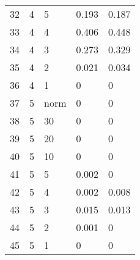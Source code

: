 \begin{table}[ht]
\begin{tabular}{rllll}
  32 & 4 & 5 & 0.193 & 0.187 \\ 
  33 & 4 & 4 & 0.406 & 0.448 \\ 
  34 & 4 & 3 & 0.273 & 0.329 \\ 
  35 & 4 & 2 & 0.021 & 0.034 \\ 
  36 & 4 & 1 & 0 & 0 \\ 
  37 & 5 & norm & 0 & 0 \\ 
  38 & 5 & 30 & 0 & 0 \\ 
  39 & 5 & 20 & 0 & 0 \\ 
  40 & 5 & 10 & 0 & 0 \\ 
  41 & 5 & 5 & 0.002 & 0 \\ 
  42 & 5 & 4 & 0.002 & 0.008 \\ 
  43 & 5 & 3 & 0.015 & 0.013 \\ 
  44 & 5 & 2 & 0.001 & 0 \\ 
  45 & 5 & 1 & 0 & 0 \\ 
   \hline
\end{tabular}
\end{table}

